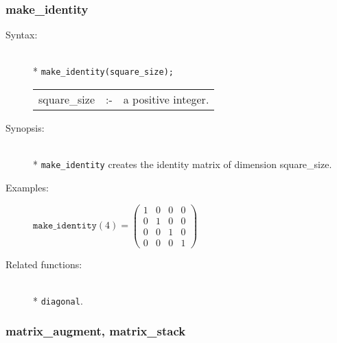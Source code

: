 \subsubsection{make\_identity}
\label{linalg:make_identity}

\begin{description}
\item[Syntax:]\mbox{}\\*
\texttt{make\_identity(square\_size);}\\[2mm]
\begin{tabular}{l l l}
square\_size &:-& a positive integer.
\end{tabular}

\item[Synopsis:]\mbox{}\\*
\texttt{make\_identity} creates the identity matrix of 
                dimension square\_size.

\item[Examples:]
\begin{flushleft}  
\begin{math}  
\texttt{make\_identity}(4)  =  
        \begin{pmatrix} 1 & 0 & 0 & 0 \\ 0 & 1 & 0 & 0 \\
                        0 & 0 & 1 & 0 \\ 0 & 0 & 0 & 1
 \end{pmatrix}
\end{math}  
\end{flushleft}

\item[Related functions:]\mbox{}\\*
\texttt{diagonal}.
\end{description}


\subsubsection{matrix\_augment, matrix\_stack}
\label{linalg:matrix_augment}

